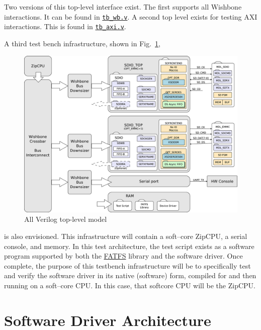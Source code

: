 \documentclass{gqtekspec}
\newcommand{\zhref}[2]{\href{#1}{\textcolor{dkblue}{#2}}}
\begin{document}
Two versions of this top-level interface exist.  The first supports
all Wishbone interactions.  It can be found in
\zhref{../bench/verilog/tb\_wb.v}{\tt tb\_wb.v}.  A second top level exists for
testing AXI interactions.  This is found in
\zhref{../bench/verilog/tb\_axi.v}{\tt tb\_axi.v}.

A third test bench infrastructure, shown in Fig.~\ref{fig:cputb},
\begin{figure}\begin{center}
\includegraphics[width=5.0in]{gfx/cputb.eps}
\caption{All Verilog top-level model}\label{fig:cputb}
\end{center}\end{figure}
is also envisioned.  This infrastructure will contain a soft--core ZipCPU,
a serial console, and memory.  In this test architecture, the test script
exists as a software program supported by both the
\zhref{http://elm-chan.org/fsw/ff/}{FATFS} library and the
software driver.  Once complete, the purpose of this testbench infrastructure
will be to specifically test and verify the software driver in its native
(software) form, compiled for and then running on a soft--core CPU.  In this
case, that softcore CPU will be the ZipCPU.

\section{Software Driver Architecture}\label{sec:arch-swdrvr}
\end{document}
